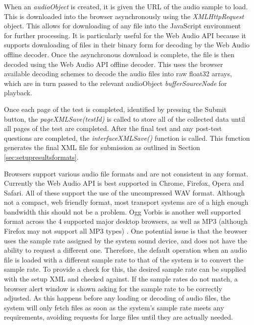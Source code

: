 \documentclass{article}
\begin{document}
When an \textit{audioObject} is created, it is given the URL of the audio sample to load. This is downloaded into the browser asynchronously using the \textit{XMLHttpRequest} object. This allows for downloading of any file into the JavaScript environment for further processing. It is particularly useful for the Web Audio API because it supports downloading of files in their binary form for decoding by the Web Audio offline decoder.
Once the asynchronous download is complete, the file is then decoded using the Web Audio API offline decoder. This uses the browser available decoding schemes to decode the audio files into raw float32 arrays, which are in turn passed to the relevant audioObject \textit{bufferSourceNode} for playback.

Once each page of the test is completed, identified by pressing the Submit button, the \textit{pageXMLSave(testId)} is called to store all of the collected data until all pages of the test are completed. After the final test and any post-test questions are completed, the \textit{interfaceXMLSave()} function is called. This function generates the final XML file for submission as outlined in Section \ref{sec:setupresultsformats}.

Browsers support various audio file formats and are not consistent in any format. Currently the Web Audio API is best supported in Chrome, Firefox, Opera and Safari. All of these support the use of the uncompressed WAV format. Although not a compact, web friendly format, most transport systems are of a high enough bandwidth this should not be a problem. Ogg Vorbis is another well supported format across the 4 supported major desktop browsers, as well as MP3 (although Firefox may not support all MP3 types) \cite{mozdevSupportedMedia}. %
One potential issue is that the browser uses the sample rate assigned by the system sound device, %
and does not have the ability to request a different one. Therefore, the default operation when an audio file is loaded with a different sample rate to that of the system is to convert the sample rate. To provide a check for this, the desired sample rate can be supplied with the setup XML and checked against. If the sample rates do not match, a browser alert window is shown asking for the sample rate to be correctly adjusted. 
As this happens before any loading or decoding of audio files, the system will only fetch files as soon as the system's sample rate meets any requirements, avoiding requests for large files until they are actually needed.
\end{document}
